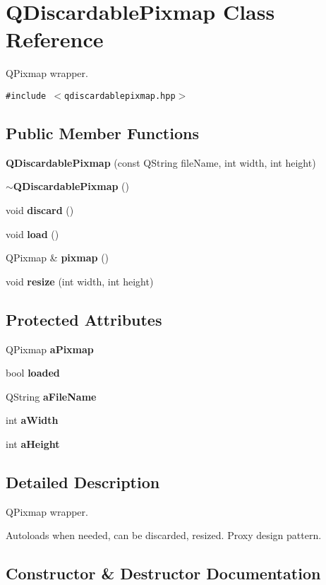 \section{QDiscardable\-Pixmap Class Reference}
\label{classQDiscardablePixmap}
QPixmap wrapper.  


{\tt \#include $<$qdiscardablepixmap.hpp$>$}

\subsection*{Public Member Functions}
\begin{CompactItemize}
\item 
{\bf QDiscardable\-Pixmap} (const QString file\-Name, int width, int height)
\item 
{\bf $\sim$QDiscardable\-Pixmap} ()
\item 
void {\bf discard} ()
\item 
void {\bf load} ()
\item 
QPixmap \& {\bf pixmap} ()
\item 
void {\bf resize} (int width, int height)
\end{CompactItemize}
\subsection*{Protected Attributes}
\begin{CompactItemize}
\item 
QPixmap {\bf a\-Pixmap}
\item 
bool {\bf loaded}
\item 
QString {\bf a\-File\-Name}
\item 
int {\bf a\-Width}
\item 
int {\bf a\-Height}
\end{CompactItemize}


\subsection{Detailed Description}
QPixmap wrapper. 

Autoloads when needed, can be discarded, resized. Proxy design pattern.



\subsection{Constructor \& Destructor Documentation}
